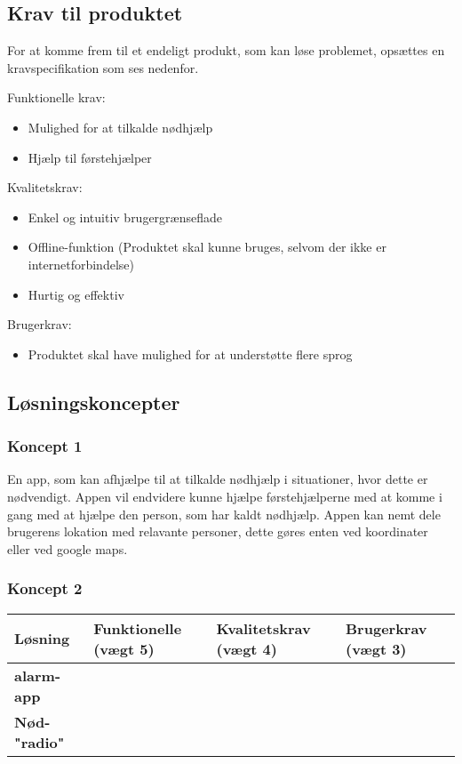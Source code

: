 

\subsection{Krav til produktet}
For at komme frem til et endeligt produkt, som kan løse problemet, opsættes en kravspecifikation som ses nedenfor.

Funktionelle krav:
\begin{itemize}
    \item Mulighed for at tilkalde nødhjælp
    \item Hjælp til førstehjælper
\end{itemize}

Kvalitetskrav:
\begin{itemize}
    \item Enkel og intuitiv brugergrænseflade
    \item Offline-funktion (Produktet skal kunne bruges, selvom der ikke er internetforbindelse)
    \item Hurtig og effektiv
\end{itemize}

Brugerkrav:
\begin{itemize}
    \item Produktet skal have mulighed for at understøtte flere sprog
\end{itemize}

\subsection{Løsningskoncepter}
\subsubsection{Koncept 1}
En app, som kan afhjælpe til at tilkalde nødhjælp i situationer, hvor dette er nødvendigt. Appen vil endvidere kunne hjælpe førstehjælperne med at komme i gang med at hjælpe den person, som har kaldt nødhjælp. Appen kan nemt dele brugerens lokation med relavante personer, dette gøres enten ved koordinater eller ved google maps.

\subsubsection{Koncept 2}

\begin{table}[H]
    \begin{tabular}{|l|l|l|l|}
        \hline
        \textbf{Løsning} & \textbf{Funktionelle (vægt 5)} & \textbf{Kvalitetskrav (vægt 4)} & \textbf{Brugerkrav (vægt 3)} \\
        \hline
        \textbf{alarm-app} &  &  &  \\
        \hline
        \textbf{Nød-"radio"} &  &  &  \\
        \hline
    \end{tabular}
\end{table}


